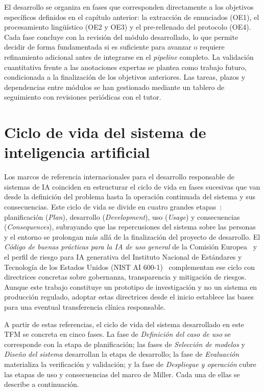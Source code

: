 El desarrollo se organiza en fases que corresponden directamente a los objetivos
específicos definidos en el capítulo anterior: la extracción de enunciados (OE1), el
procesamiento lingüístico (OE2 y OE3) y el pre-rellenado del protocolo (OE4). Cada
fase concluye con la revisión del módulo desarrollado, lo que permite decidir de forma
fundamentada si es suficiente para avanzar o requiere refinamiento adicional antes de
integrarse en el \emph{pipeline} completo. La validación cuantitativa frente a las
anotaciones expertas se plantea como trabajo futuro, condicionada a la finalización
de los objetivos anteriores. Las tareas, plazos y dependencias
entre módulos se han gestionado mediante un tablero de seguimiento con revisiones
periódicas con el tutor.


\section{Ciclo de vida del sistema de inteligencia artificial}
\label{sec:ciclo_vida_ia}

Los marcos de referencia internacionales para el desarrollo responsable de sistemas de
\ac{IA} coinciden en estructurar el ciclo de vida en fases sucesivas que van desde la
definición del problema hasta la operación continuada del sistema y sus consecuencias.
Este ciclo de vida se divide en cuatro grandes etapas~\cite{miller2025framework}:
planificación (\emph{Plan}), desarrollo (\emph{Development}), uso (\emph{Usage}) y
consecuencias (\emph{Consequences}), subrayando que las repercusiones del sistema
sobre las personas y el entorno se prolongan más allá de la finalización del proyecto
de desarrollo. El \emph{Código de buenas prácticas para la \ac{IA} de uso general} de
la Comisión Europea~\cite{eu_ai_code_practice} y el perfil de riesgo para \ac{IA}
generativa del Instituto Nacional de Estándares y Tecnología de los Estados Unidos
(\ac{NIST} AI 600-1)~\cite{nist_ai_600_1} complementan ese ciclo con directrices
concretas sobre gobernanza, transparencia y mitigación de riesgos. Aunque este trabajo
constituye un prototipo de investigación y no un sistema en producción regulado,
adoptar estas directrices desde el inicio establece las bases para una eventual
transferencia clínica responsable.

A partir de estas referencias, el ciclo de vida del sistema desarrollado en este
\ac{TFM} se concreta en cinco fases. La fase de \emph{Definición del caso de uso} se
corresponde con la etapa de planificación; las fases de \emph{Selección de modelos} y
\emph{Diseño del sistema} desarrollan la etapa de desarrollo; la fase de
\emph{Evaluación} materializa la verificación y validación; y la fase de
\emph{Despliegue y operación} cubre las etapas de uso y consecuencias del marco de
Miller. Cada una de ellas se describe a continuación.


